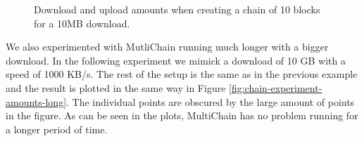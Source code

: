 \begin{figure}
\centering
{}
\caption{Download and upload amounts when creating a chain of 10 blocks for a 10MB download.}
\label{fig:chain-experiment-amounts-small}
\end{figure}

We also experimented with MutliChain running much longer with a bigger download.
In the following experiment we mimick a download of 10 GB with a speed of 1000 KB/s.
The rest of the setup is the same as in the previous example
and the result is plotted in the same way in Figure \ref{fig:chain-experiment-amounts-long}.
The individual points are obscured by the large amount of points in the figure.
As can be seen in the plots, MultiChain has no problem running for a longer period of time.

